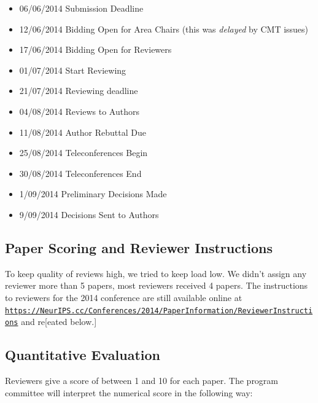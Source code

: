 \begin{itemize}
\tightlist
\item
  06/06/2014 Submission Deadline
\item
  12/06/2014 Bidding Open for Area Chairs (this was \emph{delayed} by
  CMT issues)
\item
  17/06/2014 Bidding Open for Reviewers
\item
  01/07/2014 Start Reviewing
\item
  21/07/2014 Reviewing deadline
\item
  04/08/2014 Reviews to Authors
\item
  11/08/2014 Author Rebuttal Due
\item
  25/08/2014 Teleconferences Begin
\item
  30/08/2014 Teleconferences End
\item
  1/09/2014 Preliminary Decisions Made
\item
  9/09/2014 Decisions Sent to Authors
\end{itemize}

\hypertarget{paper-scoring-and-reviewer-instructions}{%
\subsection{Paper Scoring and Reviewer
Instructions}\label{paper-scoring-and-reviewer-instructions}}

\begin{flushright}
\end{flushright}


To keep quality of reviews high, we tried to keep load low. We didn't
assign any reviewer more than 5 papers, most reviewers received 4
papers.
The instructions to reviewers for the 2014 conference are still
available online at 
\href{https://NeurIPS.cc/Conferences/2014/PaperInformation/ReviewerInstructions}{{\tt https://NeurIPS.cc/Conferences/2014/PaperInformation/ReviewerInstructions}} and re[eated below.]
\hypertarget{quantitative-evaluation}{%
\subsection{Quantitative Evaluation}\label{quantitative-evaluation}}

Reviewers give a score of between 1 and 10 for each paper. The program
committee will interpret the numerical score in the following way:

